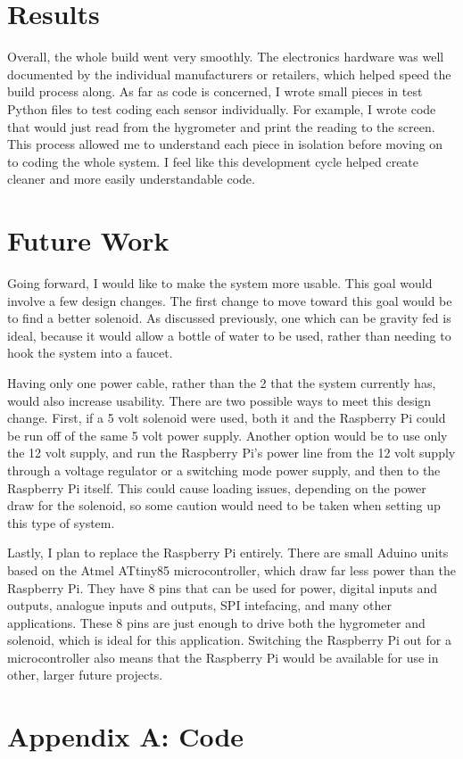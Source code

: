 \documentclass[11pt] {article}
\begin{document}

\section{Results}
Overall, the whole build went very smoothly. The electronics hardware was well documented by the individual
manufacturers or retailers, which helped speed the build process along. As far as code is concerned, I wrote small
pieces in test Python files to test coding each sensor individually. For example, I wrote code that would just read
from the hygrometer and print the reading to the screen. This process allowed me to understand each piece in isolation
before moving on to coding the whole system. I feel like this development cycle helped create cleaner and more easily
understandable code.

\section{Future Work}
Going forward, I would like to make the system more usable. This goal would involve a few design changes. The first
change to move toward this goal would be to find a better solenoid. As discussed previously, one which can be gravity
fed is ideal, because it would allow a bottle of water to be used, rather than needing to hook the system into a
faucet.

Having only one power cable, rather than the 2 that the system currently has, would also increase usability. There are
two possible ways to meet this design change. First, if a 5 volt solenoid were used, both it and the Raspberry Pi could
be run off of the same 5 volt power supply. Another option would be to use only the 12 volt supply, and run the
Raspberry Pi's power line from the 12 volt supply through a voltage regulator or a switching mode power supply,
and then to the Raspberry Pi itself. This could cause loading issues, depending on the power draw for the solenoid, so
some caution would need to be taken when setting up this type of system.

Lastly, I plan to replace the Raspberry Pi entirely. There are small Aduino units based on the Atmel ATtiny85
microcontroller, which draw far less power than the Raspberry Pi. They have 8 pins that can be used for power, digital
inputs and outputs, analogue inputs and outputs, SPI intefacing, and many other applications. These 8 pins are just
enough to drive both the hygrometer and solenoid, which is ideal for this application. Switching the Raspberry Pi out
for a microcontroller also means that the Raspberry Pi would be available for use in other, larger future projects.

\newpage
\section*{Appendix A: Code}
\
\end{document}
